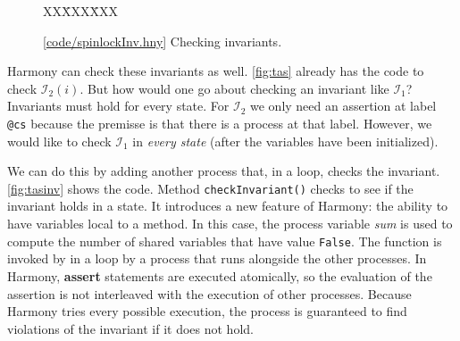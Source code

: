 \documentclass{report}
\newcommand{\harmonysource}[1]{
\begin{tabbing}
XX\=XXX\=XXX\kill
    
\end{tabbing}
}
\newcommand{\harmonylink}[1]{%
[\href{https://www.cs.cornell.edu/home/rvr/harmony/#1}{\underline{#1}}]%
}
\newenvironment{code}{
\tcolorbox
}{
\endtcolorbox
}
\begin{document}
\begin{figure}
\begin{code}
\harmonysource{spinlockInv}
\end{code}
\caption{\harmonylink{code/spinlockInv.hny} Checking invariants.}
\label{fig:tasinv}
\end{figure}

Harmony can check these invariants as well.  \autoref{fig:tas} already
has the code to check $\mathcal{I}_2(i)$.  But how would one go about checking an
invariant like $\mathcal{I}_1$?  Invariants must hold for every state.
For $\mathcal{I}_2$ we only need an assertion at label \texttt{@cs} because the
premisse is that there is a process at that label.  However, we would
like to check $\mathcal{I}_1$ in \emph{every state} (after the variables have
been initialized).

We can do this by adding another process that, in a loop,
checks the invariant.  \autoref{fig:tasinv} shows the code.
Method \texttt{checkInvariant()} checks to see if the invariant holds
in a state.  It introduces a new feature of Harmony: the ability to have
variables local to a method.  In this case, the process variable \textit{sum}
is used to compute the number of shared variables that have value
\texttt{False}.
The function is invoked by in a loop by a process that runs alongside
the other processes.
In Harmony, \textbf{assert} statements are executed atomically, so the
evaluation of the assertion is not interleaved with the execution
of other processes.
Because Harmony tries every possible execution, the process is guaranteed
to find violations of the invariant if it does not hold.
\end{document}
